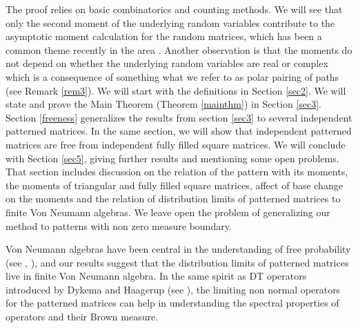 \documentclass[12pt]{amsart}
\theoremstyle{definition}
\theoremstyle{remark}
\begin{document}
The proof relies on basic combinatorics and counting methods. We will see that only the second moment of the underlying random variables contribute to the asymptotic moment calculation for the random matrices, which has been a common theme recently in the area \cite{tao}. Another observation is that the moments do not depend on whether the underlying random variables are real or complex which is a consequence of something what we refer to as polar pairing of paths (see Remark \ref{rem3}). We will start with the definitions in Section \ref{sec2}. We will state and prove the Main Theorem (Theorem \ref{mainthm}) in Section \ref{sec3}. Section \ref{freeness} generalizes the results from section \ref{sec3} to several independent patterned matrices. In the same section, we will show that independent patterned matrices are free from independent fully filled square matrices. We will conclude with Section \ref{sec5}, giving further results and mentioning some open problems. That section includes discussion on the relation of the pattern with its moments, the moments of triangular and fully filled square matrices, affect of base change on the moments and the relation of distribution limits of patterned matrices to finite Von Neumann algebras. We leave open the problem of generalizing our method to patterns with non zero measure boundary. \par
 Von Neumann algebras have been central in the understanding of free probability (see \cite{dykemainv}, \cite{guionnet2010random}), and our results suggest that the distribution limits of patterned matrices live in finite Von Neumann algebra. In the same spirit as  DT operators introduced by Dykema and Haagerup (see \cite{dykema}), the limiting non normal operators for the patterned matrices can help in understanding the spectral properties of operators and their Brown measure. 







\end{document}

